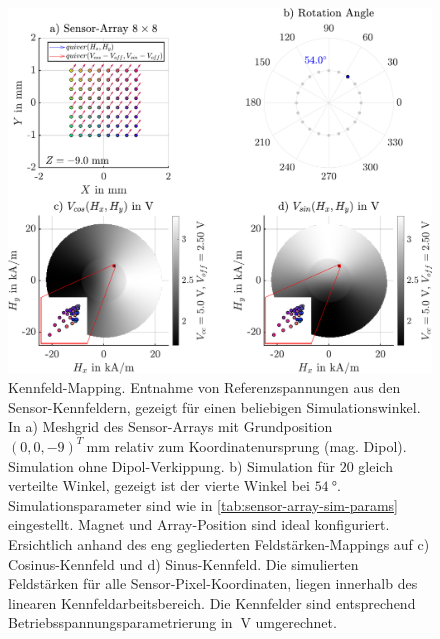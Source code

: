 \begin{figure}[tph]
	\centering
	\includegraphics[width=.99\linewidth]{appendix/images/5-Sensor-Array-Sim-Imp/Kennfeld-Mapping}
	\caption[Kennfeld-Mapping]{Kennfeld-Mapping. Entnahme von Referenzspannungen aus den Sensor-Kennfeldern, gezeigt für einen beliebigen Simulationswinkel. In a) Meshgrid des Sensor-Arrays mit Grundposition $(0,0,-9)^T \SI{}{\milli\metre}$ relativ zum Koordinatenursprung (mag. Dipol). Simulation ohne Dipol-Verkippung. b) Simulation für $20$ gleich verteilte Winkel, gezeigt ist der vierte Winkel bei $\SI{54}{\degree}$. Simulationsparameter sind wie in \autoref{tab:sensor-array-sim-params} eingestellt. Magnet und Array-Position sind ideal konfiguriert. Ersichtlich anhand des eng gegliederten Feldstärken-Mappings auf c) Cosinus-Kennfeld und d) Sinus-Kennfeld. Die simulierten Feldstärken für alle Sensor-Pixel-Koordinaten, liegen innerhalb des linearen Kennfeldarbeitsbereich. Die Kennfelder sind entsprechend Betriebsspannungsparametrierung in $\SI{}{\volt}$ umgerechnet.}
	\label{fig:kennfeld-mapping}
\end{figure}


\clearpage


